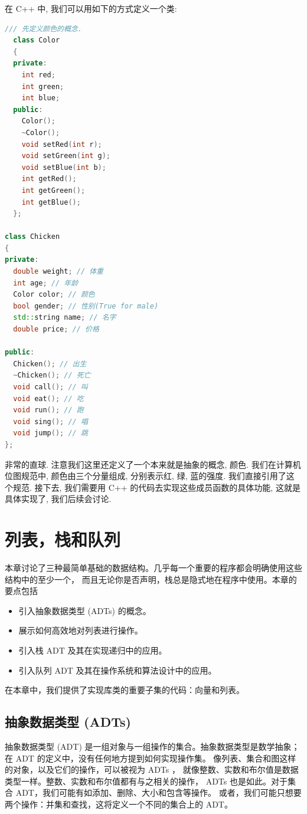 \documentclass[a4paper]{ctexart}
\theoremstyle{definition}
\theoremstyle{definition}
\begin{document}
在 C++ 中, 我们可以用如下的方式定义一个类:
\begin{lstlisting}[language=C++]
  /// 先定义颜色的概念.
  class Color
  {
  private:
    int red;
    int green;
    int blue;
  public:
    Color();
    ~Color();
    void setRed(int r);
    void setGreen(int g);
    void setBlue(int b);
    int getRed();
    int getGreen();
    int getBlue();
  };  

class Chicken
{
private:
  double weight; // 体重
  int age; // 年龄
  Color color; // 颜色
  bool gender; // 性别(True for male)
  std::string name; // 名字
  double price; // 价格
  
public:
  Chicken(); // 出生
  ~Chicken(); // 死亡
  void call(); // 叫
  void eat(); // 吃
  void run(); // 跑
  void sing(); // 唱
  void jump(); // 跳
};
\end{lstlisting}
非常的直球. 注意我们这里还定义了一个本来就是抽象的概念, 颜色. 我们在计算机位图规范中, 
颜色由三个分量组成, 分别表示红, 绿, 蓝的强度. 我们直接引用了这个规范. 接下去, 我们需要用 C++ 的代码去实现这些成员函数的具体功能, 
这就是具体实现了, 我们后续会讨论. 

\section{列表，栈和队列}

本章讨论了三种最简单基础的数据结构。几乎每一个重要的程序都会明确使用这些结构中的至少一个，
而且无论你是否声明，栈总是隐式地在程序中使用。本章的要点包括

\begin{itemize}
  \item 引入抽象数据类型 (ADTs) 的概念。
  \item 展示如何高效地对列表进行操作。
  \item 引入栈 ADT 及其在实现递归中的应用。
  \item 引入队列 ADT 及其在操作系统和算法设计中的应用。  
\end{itemize}

在本章中，我们提供了实现库类的重要子集的代码：向量和列表。

\subsection{抽象数据类型 (ADTs)}
抽象数据类型 (ADT) 是一组对象与一组操作的集合。抽象数据类型是数学抽象；
在 ADT 的定义中，没有任何地方提到如何实现操作集。
像列表、集合和图这样的对象，以及它们的操作，可以被视为 ADTs ，
就像整数、实数和布尔值是数据类型一样。整数、实数和布尔值都有与之相关的操作，
ADTs 也是如此。对于集合 ADT，我们可能有如添加、删除、大小和包含等操作。
或者，我们可能只想要两个操作：并集和查找，这将定义一个不同的集合上的 ADT。
\end{document}
